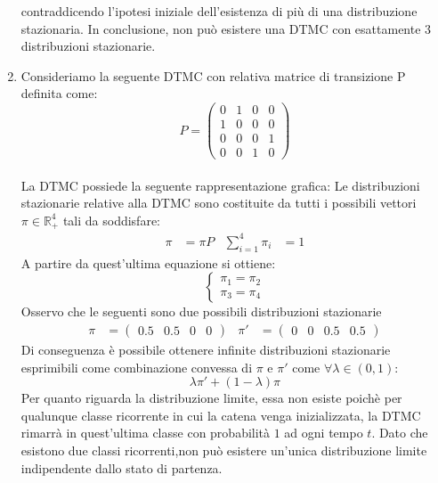 \documentclass[
	12pt, %
]{fphw}
\begin{document}
\begin{enumerate}
	contraddicendo l'ipotesi iniziale dell'esistenza di più di una distribuzione stazionaria.
	In conclusione, non può esistere una DTMC con esattamente $3$ distribuzioni stazionarie.
	\item Consideriamo la seguente DTMC con relativa matrice di transizione P definita come:
	\begin{equation*}
		P = \begin{pmatrix}
			0 & 1 & 0 & 0\\
			1 & 0 & 0 & 0\\
			0 & 0 & 0 & 1\\
			0 & 0 & 1 & 0
		\end{pmatrix}
	\end{equation*}\\
	La DTMC possiede la seguente rappresentazione grafica:
	Le distribuzioni stazionarie relative alla DTMC sono costituite da tutti i possibili vettori $\pi \in \mathbb{R}_+ ^4$ tali da soddisfare:
	\begin{align*}
	\pi &= \pi P & \sum_{i = 1}^{4} \pi_i &= 1 
	\end{align*}
	A partire da quest'ultima equazione si ottiene:
	\begin{equation*}
		\begin{cases} 
			\pi_1 = \pi_2\\
			\pi_3 = \pi_4
		\end{cases}
	\end{equation*}
	Osservo che le seguenti sono due possibili distribuzioni stazionarie
	\begin{align*}
		\pi &= \begin{pmatrix}
			0.5 & 0.5 & 0 & 0 
		\end{pmatrix} & 
		\pi' &= \begin{pmatrix}
			0 & 0 & 0.5 & 0.5 
		\end{pmatrix}
	\end{align*}
	Di conseguenza è possibile ottenere infinite distribuzioni stazionarie
	esprimibili come combinazione convessa di $\pi$ e $\pi'$ come $\forall \lambda \in (0,1)$:
	\begin{equation*}
		\lambda \pi' + (1-\lambda ) \pi 
	\end{equation*}
	Per quanto riguarda la distribuzione limite, essa non esiste poichè per qualunque classe ricorrente
	in cui la catena venga inizializzata, la DTMC rimarrà in quest'ultima classe con probabilità $1$ ad ogni tempo $t$.
	Dato che esistono due classi ricorrenti,non può esistere un'unica distribuzione limite indipendente dallo stato di partenza.\\


\end{enumerate}
\end{document}
